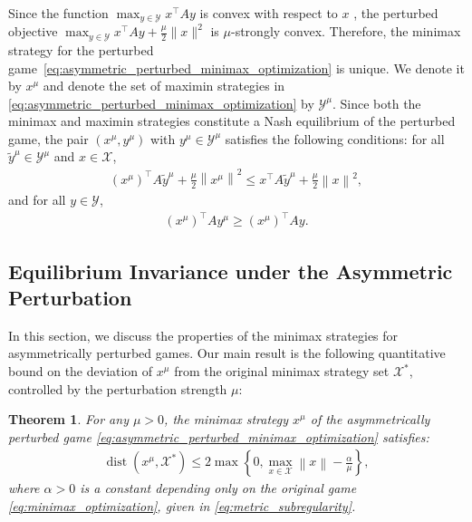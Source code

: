 \documentclass{article}
\DeclareMathOperator{\dist}{dist}
\newcommand{\X}{\mathcal{X}}
\newcommand{\Y}{\mathcal{Y}}
\theoremstyle{plain}
\newtheorem{theorem}{Theorem}[section]
\begin{document}
Since the function $\max_{y\in \Y}x^{\top}Ay$ is convex with respect to $x$ \citep{boyd2004convex}, the perturbed objective $\max_{y\in \Y}x^{\top}Ay + \frac{\mu}{2}\|x\|^2$ is $\mu$-strongly convex.
Therefore, the minimax strategy for the perturbed game~\eqref{eq:asymmetric_perturbed_minimax_optimization} is unique.
We denote it by $x^{\mu}$ and denote the set of maximin strategies in \eqref{eq:asymmetric_perturbed_minimax_optimization} by $\Y^{\mu}$.
Since both the minimax and maximin strategies constitute a Nash equilibrium of the perturbed game, the pair $(x^{\mu}, y^{\mu})$ with $y^{\mu}\in \Y^{\mu}$ satisfies the following conditions: for all $\tilde{y}^{\mu}\in \Y^{\mu}$ and $x\in \X$,
\begin{align}
    (x^{\mu})^{\top}A\tilde{y}^{\mu} + \frac{\mu}{2}\left\|x^{\mu}\right\|^2 \leq x^{\top}A\tilde{y}^{\mu} + \frac{\mu}{2}\left\|x\right\|^2,
    \label{eq:property_of_equilibrium_in_asymmetrically_perturbed_game_player_x}
\end{align}
and for all $y\in \Y$,
\begin{align}
    (x^{\mu})^{\top}Ay^{\mu} \geq (x^{\mu})^{\top}Ay.
    \label{eq:property_of_equilibrium_in_asymmetrically_perturbed_game_player_y}
\end{align}


\subsection{Equilibrium Invariance under the Asymmetric Perturbation}
In this section, we discuss the properties of the minimax strategies for asymmetrically perturbed games.
Our main result is the following quantitative bound on the deviation of $x^{\mu}$ from the original minimax strategy set $\X^{\ast}$, controlled by the perturbation strength $\mu$:
\begin{theorem}
    \label{thm:optimality_of_perturbed_equilibrium}
    For any $\mu > 0$, the minimax strategy $x^{\mu}$ of the asymmetrically perturbed game \eqref{eq:asymmetric_perturbed_minimax_optimization} satisfies:
    \begin{align*}
        \dist(x^{\mu}, \X^{\ast}) \leq 2 \max\left\{0, \max_{x\in \X}\left\|x\right\| - \frac{\alpha}{\mu}\right\},
    \end{align*}
    where $\alpha > 0$ is a constant depending only on the original game \eqref{eq:minimax_optimization}, given in \eqref{eq:metric_subregularity}.
\end{theorem}
\end{document}
